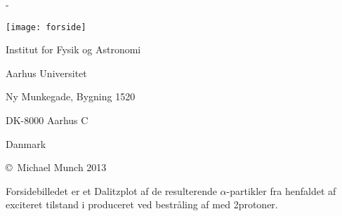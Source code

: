 \begin{titlingpage}
  \thispagestyle{empty}
  \calccentering{\unitlength} %
  \begin{adjustwidth*}{\unitlength}{-\unitlength}
    \begin{adjustwidth}{-1cm}{-1cm}
      \centering
      { \setlength{\baselineskip}{24pt}
        {\Huge {} \par
        }\par
        \par\vspace*{4\onelineskip}
        \par
        \texttt{[image: forside]} 
        \par\vspace*{4\onelineskip}
        \par
        \large{}\par
      }
      \vfill
      \vspace*{2\onelineskip}
      \hfill
      \par\vspace*{2\onelineskip}
      \small
      \par
      \enlargethispage{2\onelineskip}
    \end{adjustwidth}
  \end{adjustwidth*}
  \newpage
  \thispagestyle{empty} %
  \small
  \strut\vfill  %
  \begin{flushleft}
    Institut for Fysik og Astronomi \par
    Aarhus Universitet \par
    Ny Munkegade, Bygning 1520 \par
    DK-8000 Aarhus C \par
    Danmark \par
    \vspace{\onelineskip}
    
    \copyright\ Michael Munch 2013 \par
    \vspace{\onelineskip}
    Forsidebilledet er et Dalitzplot af de resulterende $\alpha$-partikler fra henfaldet af exciteret
    tilstand i \Carb produceret ved bestråling af \Bor med 2\MeV protoner.
  \end{flushleft}
\end{titlingpage}